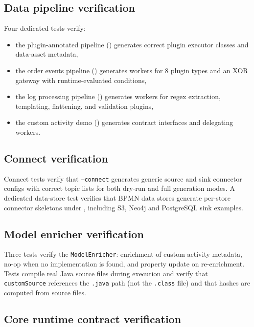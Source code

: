 \subsection{Data pipeline verification}

Four dedicated tests verify:
\begin{itemize}
\item the plugin-annotated pipeline ()
  generates correct plugin executor classes and data-asset metadata,
\item the order events pipeline ()
  generates workers for 8 plugin types and an XOR gateway with
  runtime-evaluated conditions,
\item the log processing pipeline ()
  generates workers for regex extraction, templating, flattening, and
  validation plugins,
\item the custom activity demo ()
  generates contract interfaces and delegating workers.
\end{itemize}

\subsection{Connect verification}

Connect tests verify that \texttt{--connect} generates generic source and sink
connector configs with correct topic lists for both dry-run and full generation
modes. A dedicated data-store test verifies that BPMN data stores generate
per-store connector skeletons under , including
S3, Neo4j and PostgreSQL sink examples.

\subsection{Model enricher verification}

Three tests verify the \texttt{ModelEnricher}: enrichment of custom
activity metadata, no-op when no implementation is found, and property
update on re-enrichment. Tests compile real Java source files during
execution and verify that \texttt{customSource} references the
\texttt{.java} path (not the \texttt{.class} file) and that hashes are
computed from source files.

\subsection{Core runtime contract verification}

